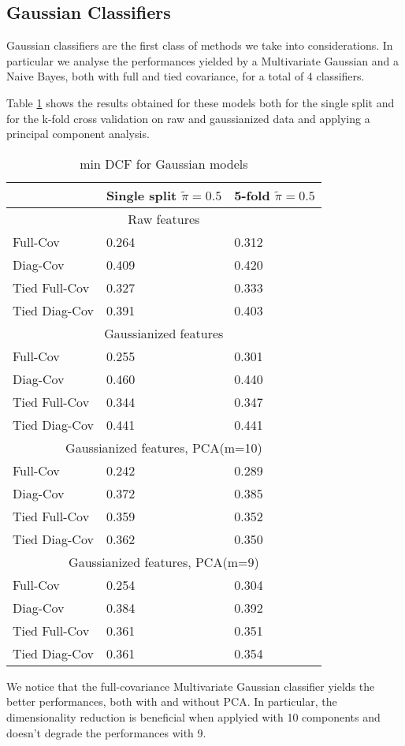 \subsection{Gaussian Classifiers}

Gaussian classifiers are the first class of methods we take into considerations. In particular we analyse the performances yielded by a Multivariate Gaussian and a Naive Bayes, both with full and tied covariance, for a total of 4 classifiers.
 
Table \ref{tab:gaus_res} shows the results obtained for these models both for the single split and for the k-fold cross validation on raw and gaussianized data and applying a principal component analysis.

\noindent
\begin{table}[H]
\begin{tabular}{ p{2.5cm} p{2cm} p{1.5cm}  }
	\hline
	\hline
	& \makecell{\textbf{Single split} \\ $\tilde{\pi} = 0.5$} & \makecell{\textbf{5-fold} \\ $\tilde{\pi} = 0.5$} \\
	\hline
	\multicolumn{3}{c}{Raw features} \\
	\hline
	Full-Cov & 0.264 &  0.312 \\
	Diag-Cov & 0.409 & 0.420 \\
	Tied Full-Cov & 0.327 & 0.333 \\
	Tied Diag-Cov &  0.391 & 0.403 \\	
	\hline
	\multicolumn{3}{c}{Gaussianized features} \\
	\hline
	Full-Cov &  \boxit{blue}{1.3in}0.255 &  0.301 \\
	Diag-Cov & 0.460 & 0.440 \\
	Tied Full-Cov & 0.344 & 0.347 \\
	Tied Diag-Cov &  0.441 & 0.441 \\	
	\hline
	\multicolumn{3}{c}{Gaussianized features, PCA(m=10)} \\
	\hline
	Full-Cov & \boxit{red}{1.3in}0.242 & 0.289 \\
	Diag-Cov & 0.372 & 0.385 \\
	Tied Full-Cov & 0.359 & 0.352 \\
	Tied Diag-Cov &  0.362 & 0.350 \\	
	\hline
	\multicolumn{3}{c}{Gaussianized features, PCA(m=9)} \\
	\hline
	Full-Cov & 0.254 &  0.304 \\
	Diag-Cov & 0.384 & 0.392 \\
	Tied Full-Cov & 0.361 & 0.351 \\
	Tied Diag-Cov &  0.361 & 0.354 \\	
	\hline
\end{tabular}
\caption{min DCF for Gaussian models}
\label{tab:gaus_res}
\end{table}
We notice that the full-covariance Multivariate Gaussian classifier yields the better performances, both with and without PCA. In particular, the dimensionality reduction is beneficial when applyied with 10 components and doesn't degrade the performances with 9.

